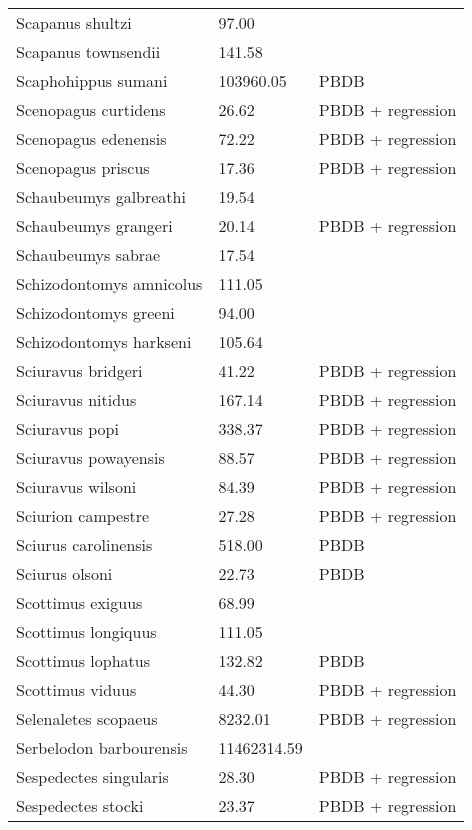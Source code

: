 \begin{center}
\begin{longtable}{p{} p{} p{} }
  Scapanus shultzi & 97.00 & \cite{McKenna2011} \\ 
  Scapanus townsendii & 141.58 & \cite{Smith2004} \\ 
  Scaphohippus sumani & 103960.05 & PBDB \\ 
  Scenopagus curtidens & 26.62 & PBDB + regression \\ 
  Scenopagus edenensis & 72.22 & PBDB + regression \\ 
  Scenopagus priscus & 17.36 & PBDB + regression \\ 
  Schaubeumys galbreathi & 19.54 & \cite{Loomis1911} \\ 
  Schaubeumys grangeri & 20.14 & PBDB + regression \\ 
  Schaubeumys sabrae & 17.54 & \cite{Matthew1901} \\ 
  Schizodontomys amnicolus & 111.05 & \cite{Tomiya2013} \\ 
  Schizodontomys greeni & 94.00 & \cite{McKenna2011} \\ 
  Schizodontomys harkseni & 105.64 & \cite{Tomiya2013} \\ 
  Sciuravus bridgeri & 41.22 & PBDB + regression \\ 
  Sciuravus nitidus & 167.14 & PBDB + regression \\ 
  Sciuravus popi & 338.37 & PBDB + regression \\ 
  Sciuravus powayensis & 88.57 & PBDB + regression \\ 
  Sciuravus wilsoni & 84.39 & PBDB + regression \\ 
  Sciurion campestre & 27.28 & PBDB + regression \\ 
  Sciurus carolinensis & 518.00 & PBDB \\ 
  Sciurus olsoni & 22.73 & PBDB \\ 
  Scottimus exiguus & 68.99 & \cite{Novacek1977} \\ 
  Scottimus longiquus & 111.05 & \cite{Tomiya2013} \\ 
  Scottimus lophatus & 132.82 & PBDB \\ 
  Scottimus viduus & 44.30 & PBDB + regression \\ 
  Selenaletes scopaeus & 8232.01 & PBDB + regression \\ 
  Serbelodon barbourensis & 11462314.59 & \cite{Secord2008a} \\ 
  Sespedectes singularis & 28.30 & PBDB + regression \\ 
  Sespedectes stocki & 23.37 & PBDB + regression \\ 

\end{longtable}
\end{center}
